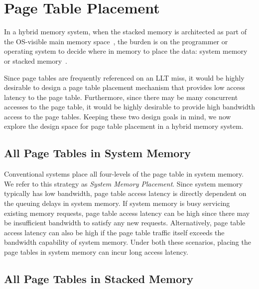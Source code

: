 \section{Page Table Placement} 
\label{sec:PT_placement}


\noindent In a hybrid memory system, when the stacked memory is
architected as part of the OS-visible main memory
space~\cite{dong-sc2010,mlm}, the burden is on the programmer or
operating system to decide where in memory to place the data: system
memory or stacked memory~\cite{bwa,hpca15_placement}.

Since page tables are frequently referenced on an LLT miss, it would
be highly desirable to design a page table placement mechanism that
provides low access latency to the page table. Furthermore, since
there may be many concurrent accesses to the page table, it would be
highly desirable to provide high bandwidth access to the page tables.
Keeping these two design goals in mind, we now explore the design
space for page table placement in a hybrid memory system.

\subsection{All Page Tables in System Memory}

\noindent Conventional systems place all four-levels of the page table
in system memory. We refer to this strategy as {\em System Memory
Placement}. Since system memory typically has low bandwidth, page
table access latency is directly dependent on the queuing delays in
system memory. If system memory is busy servicing existing memory
requests, page table access latency can be high since there may be
insufficient bandwidth to satisfy any new requests. Alternatively,
page table access latency can also be high if the page table traffic
itself exceeds the bandwidth capability of system memory. Under both
these scenarios, placing the page tables in system memory can incur
long access latency.

\subsection{All Page Tables in Stacked Memory}

